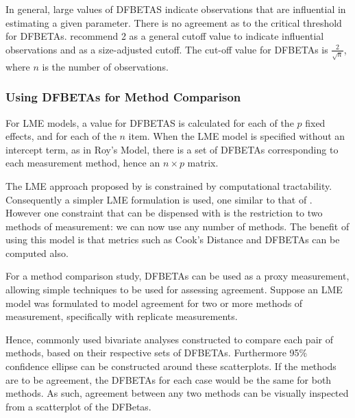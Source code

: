 \documentclass[12pt, a4paper]{report}
\theoremstyle{definition}
\theoremstyle{remark}
\begin{document}
In general, large values of DFBETAS indicate observations that are influential in estimating a given parameter. There is no agreement as to the critical threshold for DFBETAs. \citet{belsley2005} recommend 2 as a general cutoff value to indicate influential observations and as a size-adjusted cutoff.  The cut-off value for DFBETAs is $\frac{2}{\sqrt{n}}$, where $n$ is the number of observations. 



\subsubsection{Using DFBETAs for Method Comparison}
For LME models, a value for DFBETAS is calculated for each of the $p$ fixed effects, and for each of the $n$ item. When the LME model is specified without an intercept term, as in Roy's Model, there is a set of DFBETAs corresponding to each measurement method, hence an $n \times p$ matrix.

The LME approach proposed by \citet{ARoy2009} is constrained by computational tractability. Consequently a simpler LME formulation is used, one similar to that of \citet{BXC2008}. However one constraint that can be dispensed with is the restriction to two methods of measurement: we can now use any number of methods. The benefit of using this model is that metrics such as Cook's Distance and DFBETAs can be computed also.

For a method comparison study, DFBETAs can be used as a proxy measurement, allowing simple techniques to be used for assessing agreement. Suppose an LME model was formulated to model agreement for two or more methods of measurement, specifically with replicate measurements.

Hence, commonly used bivariate analyses constructed to compare each pair of methods, based on their respective sets of DFBETAs. Furthermore 95\% confidence ellipse can be constructed around these scatterplots. If the methods are to be agreement, the DFBETAs for each case would be the same for both methods. As such, agreement between any two methods can be visually inspected from a scatterplot of the DFBetas. 


\end{document}
